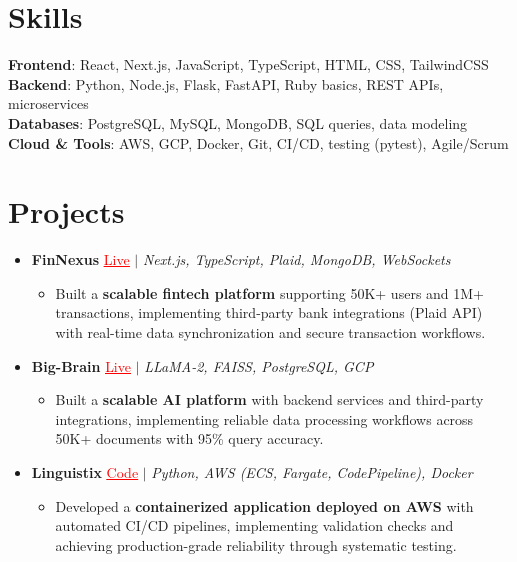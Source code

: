 \documentclass[letterpaper,10pt]{article}
\newcommand{\resumeItem}[1]{\item\small{{#1 \vspace{-2pt}}}}
\newcommand{\resumeProjectHeading}[1]{\item \small #1 \vspace{-2pt}}
\newcommand{\resumeSubHeadingListStart}{\begin{itemize}[leftmargin=0.0in, label={}]}
\newcommand{\resumeSubHeadingListEnd}{\end{itemize}}
\newcommand{\resumeProjItemListStart}{\begin{itemize}[leftmargin=0.15in,label=\textbullet,itemsep=0pt,topsep=0pt,parsep=0pt,partopsep=0pt]}
\newcommand{\resumeProjItemListEnd}{\end{itemize}\vspace{-4pt}}
\begin{document}
\section{Skills}
\begin{itemize}[leftmargin=0.15in, label={}]
\small{\item{
\textbf{Frontend}: React, Next.js, JavaScript, TypeScript, HTML, CSS, TailwindCSS \\
\textbf{Backend}: Python, Node.js, Flask, FastAPI, Ruby basics, REST APIs, microservices \\
\textbf{Databases}: PostgreSQL, MySQL, MongoDB, SQL queries, data modeling \\
\textbf{Cloud \& Tools}: AWS, GCP, Docker, Git, CI/CD, testing (pytest), Agile/Scrum
}}
\end{itemize}
\vspace{-16pt}
\section{Projects}
\resumeSubHeadingListStart
\vspace{-2pt}
\resumeProjectHeading{\textbf{FinNexus} {\href{https://fin-nexus.vercel.app/}{\textcolor{red}{\underline{Live}}}} $|$ \emph{Next.js, TypeScript, Plaid, MongoDB, WebSockets}}
\resumeProjItemListStart
\resumeItem{Built a \textbf{scalable fintech platform} supporting 50K+ users and 1M+ transactions, implementing third-party bank integrations (Plaid API) with real-time data synchronization and secure transaction workflows.}
\resumeProjItemListEnd
\vspace{3pt}
\resumeProjectHeading{\textbf{Big-Brain} {\href{https://big-brain-pied.vercel.app/}{\textcolor{red}{\underline{Live}}}} $|$ \emph{LLaMA-2, FAISS, PostgreSQL, GCP}}
\resumeProjItemListStart
\resumeItem{Built a \textbf{scalable AI platform} with backend services and third-party integrations, implementing reliable data processing workflows across 50K+ documents with 95\% query accuracy.}
\resumeProjItemListEnd
\vspace{3pt}
\resumeProjectHeading{\textbf{Linguistix} {\href{https://github.com/SAHAJ-BHADJA/Linguistix}{\textcolor{red}{\underline{Code}}}} $|$ \emph{Python, AWS (ECS, Fargate, CodePipeline), Docker}}
\resumeProjItemListStart
\resumeItem{Developed a \textbf{containerized application deployed on AWS} with automated CI/CD pipelines, implementing validation checks and achieving production-grade reliability through systematic testing.}
\resumeProjItemListEnd
\resumeSubHeadingListEnd
\end{document}
